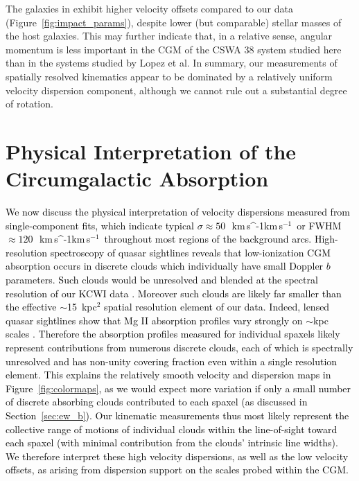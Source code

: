 \documentclass[twocolumn]{aastex62}
\newcommand{\MgII}{Mg\tiny{ }\footnotesize{II}\normalsize{ }}
\newcommand{\kms}{\ifmmode\,{\rm km}\,{\rm s}^{-1}\else km$\,$s$^{-1}$\fi}
\newcommand{\Msun}{\mathrm{M}_{\sun}}
\begin{document}
The galaxies in \cite{Lopez2018,Lopez2020} exhibit higher velocity offsets compared to our data (Figure~\ref{fig:impact_params}), despite lower (but comparable) stellar masses of the host galaxies. 
This may further indicate that, in a relative sense, angular momentum is less important in the CGM of the CSWA 38 system studied here than in the systems studied by Lopez et al. In summary, our measurements of spatially resolved kinematics appear to be dominated by a relatively uniform velocity dispersion component, although we cannot rule out a substantial degree of rotation. 

\vspace{0.1cm}


\section{Physical Interpretation of the Circumgalactic Absorption} \label{sec:model}



\textcolor{black}{We now discuss the physical interpretation of velocity dispersions measured from single-component fits, which indicate typical $\sigma \approx 50$~\kms\ or FWHM~$\approx 120$~\kms\ throughout most regions of the background arcs. High-resolution spectroscopy of quasar sightlines reveals that low-ionization CGM absorption occurs in discrete clouds which individually have small Doppler $b$ parameters. Such clouds would be unresolved and blended at the spectral resolution of our KCWI data \citep[e.g.,][]{Zabl2020}. Moreover such clouds are likely far smaller than the effective $\sim$15~kpc$^2$ spatial resolution element of our data. Indeed, lensed quasar sightlines show that \MgII absorption profiles vary strongly on $\sim$kpc scales \citep[e.g.,][]{Ellison2004,Chen2014}. Therefore the absorption profiles measured for individual spaxels likely represent contributions from numerous discrete clouds, each of which is spectrally unresolved and has non-unity covering fraction even within a single resolution element. This explains the relatively smooth velocity and dispersion maps in Figure~\ref{fig:colormaps}, as we would expect more variation if only a small number of discrete absorbing clouds contributed to each spaxel (as discussed in Section~\ref{sec:ew_b}). 
Our kinematic measurements thus most likely represent the collective range of motions of individual clouds within the line-of-sight toward each spaxel (with minimal contribution from the clouds' intrinsic line widths). 
We therefore interpret these high velocity dispersions, as well as the low velocity offsets, as arising from dispersion support on the scales probed within the CGM.}
\end{document}
